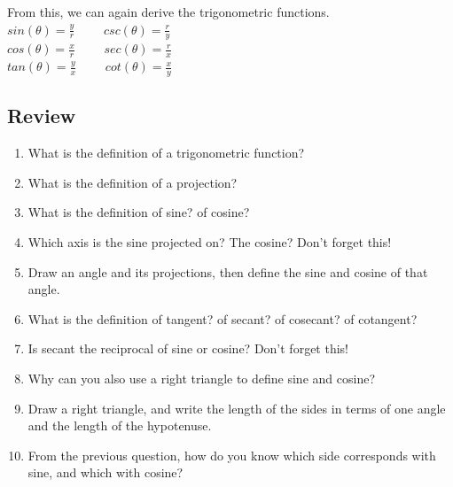 From this, we can again derive the trigonometric functions.\\

\tab$sin(\theta) = \frac{y}{r}$ \ \ \ \ $csc(\theta) = \frac{r}{y}$\\

\tab$cos(\theta) = \frac{x}{r}$ \ \ \ \ $sec(\theta) = \frac{r}{x}$\\

\tab$tan(\theta) = \frac{y}{x}$ \ \ \ \ $cot(\theta) = \frac{x}{y}$\\

\newpage
\subsection{Review}

\begin{enumerate}

\item{What is the definition of a trigonometric function?}

\item{What is the definition of a projection?}

\item{What is the definition of sine?  of cosine?}

\item{Which axis is the sine projected on?  The cosine?  Don't forget this!}

\item{Draw an angle and its projections, then define the sine and cosine of that angle.}

\item{What is the definition of tangent?  of secant?  of cosecant?  of cotangent?}

\item{Is secant the reciprocal of sine or cosine?  Don't forget this!}

\item{Why can you also use a right triangle to define sine and cosine?}

\item{Draw a right triangle, and write the length of the sides in terms of one angle and the length of the hypotenuse.}

\item{From the previous question, how do you know which side corresponds with sine, and which with cosine?}

\end{enumerate}

